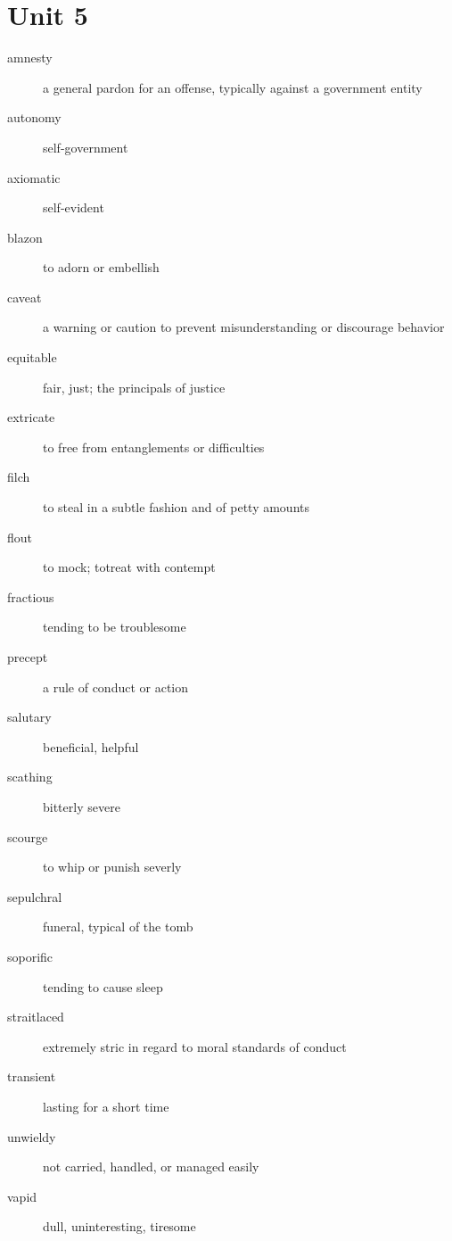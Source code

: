\section{Unit 5}
\begin{description}
  \item[amnesty] a general pardon for an offense, typically against a government
    entity
  \item[autonomy] self-government
  \item[axiomatic] self-evident
  \item[blazon] to adorn or embellish
  \item[caveat] a warning or caution to prevent misunderstanding or discourage
    behavior
  \item[equitable] fair, just; the principals of justice
  \item[extricate] to free from entanglements or difficulties
  \item[filch] to steal in a subtle fashion and of petty amounts
  \item[flout] to mock; totreat with contempt
  \item[fractious] tending to be troublesome
  \item[precept] a rule of conduct or action
  \item[salutary] beneficial, helpful
  \item[scathing] bitterly severe
  \item[scourge] to whip or punish severly
  \item[sepulchral] funeral, typical of the tomb
  \item[soporific] tending to cause sleep
  \item[straitlaced] extremely stric in regard to moral standards of conduct
  \item[transient] lasting for a short time
  \item[unwieldy] not carried, handled, or managed easily
  \item[vapid] dull, uninteresting, tiresome
\end{description}

